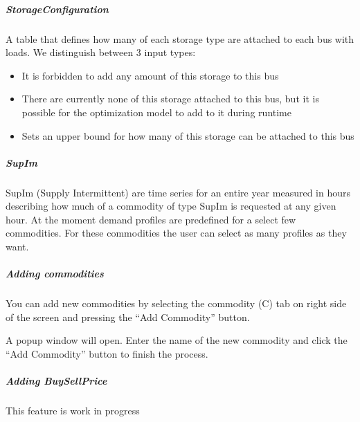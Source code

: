 \documentclass[letterpaper,10pt,english]{sphinxmanual}
\begin{document}
\subparagraph{Storage\sphinxhyphen{}Configuration}
\label{\detokenize{docs_gui/usage/urbs_setup:storage-configuration}}
\begin{DUlineblock}{0em}
\item[] A table that defines how many of each storage type are attached to each bus with loads. We distinguish between 3 input types:
\end{DUlineblock}
\begin{itemize}
\item {} 
\sphinxAtStartPar
{} It is forbidden to add any amount of this storage to this bus

\item {} 
\sphinxAtStartPar
{} There are currently none of this storage attached to this bus, but it is possible for the optimization model to add to it during runtime

\item {} 
\sphinxAtStartPar
{} Sets an upper bound for how many of this storage can be attached to this bus

\end{itemize}


\subparagraph{SupIm}
\label{\detokenize{docs_gui/usage/urbs_setup:supim}}
\begin{DUlineblock}{0em}
\item[] SupIm (Supply Intermittent) are time series for an entire year measured in hours describing how much of a commodity of type SupIm is requested at any given hour. At the moment demand profiles are predefined for
a select few commodities. For these commodities the user can select as many profiles as they want.
\end{DUlineblock}


\subparagraph{Adding commodities}
\label{\detokenize{docs_gui/usage/urbs_setup:adding-commodities}}
\begin{DUlineblock}{0em}
\item[] You can add new commodities by selecting the commodity (C) tab on right side of the screen and pressing the “Add Commodity” button.
\item[] A popup window will open. Enter the name of the new commodity and click the “Add Commodity” button to finish the process.
\end{DUlineblock}


\subparagraph{Adding Buy\sphinxhyphen{}Sell\sphinxhyphen{}Price}
\label{\detokenize{docs_gui/usage/urbs_setup:adding-buy-sell-price}}
\sphinxAtStartPar
This feature is work in progress
\end{document}
